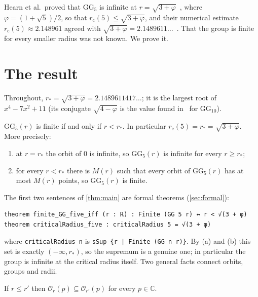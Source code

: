 \documentclass[11pt,a4paper]{article}
\newcommand{\C}{\mathbb{C}}
\newcommand{\GG}{\mathrm{GG}}
\newcommand{\rc}{r_{\mathrm c}}
\newcommand{\rs}{r_{\ast}}
\newcommand{\Or}{\mathcal{O}}
\begin{document}
Hearn et al.\ proved that $\GG_5$ is infinite at $r=\sqrt{3+\varphi}$~\cite[Thm.~2]{hkrsv}, where
$\varphi=(1+\sqrt5)/2$, so that $\rc(5)\le\sqrt{3+\varphi}$, and their numerical estimate
$\rc(5)\approx 2.148961$ agreed with $\sqrt{3+\varphi}=2.1489611\ldots$~\cite[Table~1]{hkrsv}. That
the group is finite for every smaller radius was not known. We prove it.

\section{The result}\label{sec:result}

Throughout, $\rs=\sqrt{3+\varphi}=2.1489611417\ldots$; it is the largest root of $x^4-7x^2+11$
(its conjugate $\sqrt{4-\varphi}$ is the value found in~\cite{hkrsv} for $\GG_{10}$).

\begin{theorem}\label{thm:main}
$\GG_5(r)$ is finite if and only if $r<\rs$. In particular $\rc(5)=\rs=\sqrt{3+\varphi}$. More precisely:
\begin{enumerate}[label=(\alph*),nosep]
  \item at $r=\rs$ the orbit of $0$ is infinite, so $\GG_5(r)$ is infinite for every $r\ge\rs$;
  \item for every $r<\rs$ there is $M(r)$ such that every orbit of $\GG_5(r)$ has at most $M(r)$
        points, so $\GG_5(r)$ is finite.
\end{enumerate}
\end{theorem}

The first two sentences of \cref{thm:main} are formal theorems (\cref{sec:formal}):
\begin{Verbatim}[fontsize=\small,xleftmargin=1.5em]
theorem finite_GG_five_iff (r : ℝ) : Finite (GG 5 r) ↔ r < √(3 + φ)
theorem criticalRadius_five : criticalRadius 5 = √(3 + φ)
\end{Verbatim}
where \texttt{criticalRadius n} is \texttt{sSup \{r | Finite (GG n r)\}}. By (a) and (b) this set is
exactly $(-\infty,\rs)$, so the supremum is a genuine one; in particular the group is infinite at
the critical radius itself. Two general facts connect orbits, groups and radii.

\begin{proposition}[monotonicity]\label{prop:mono}
If $r\le r'$ then $\Or_r(p)\subseteq\Or_{r'}(p)$ for every $p\in\C$.
\end{proposition}
\end{document}
